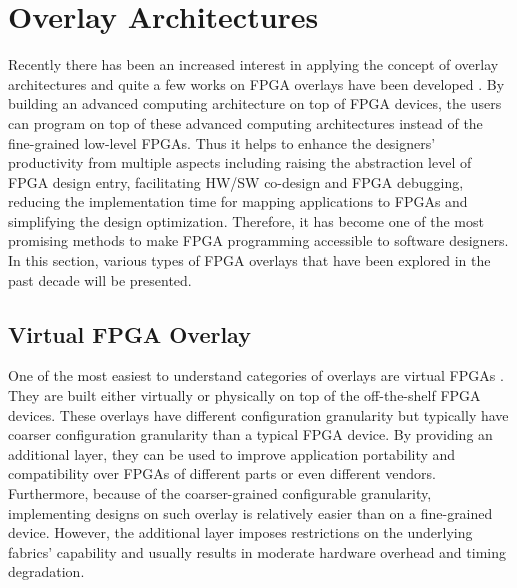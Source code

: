 \section{Overlay Architectures}
Recently there has been an increased interest in applying the concept of overlay architectures and quite a few works on FPGA overlays have been developed \cite{lysecky2005firm, brant2012ZUMA, grant2011malibu, coole2010intermediate, koch2013efficient, ferreira2011fpga, shukla2006quku, lin2012energy, capalijia2013pipelined, microblaze, nios, cheah2012iDEA, laforest2012OCTAVO, yiannacouras2007exploration, anjam2010vliw,hannig2014invasive, boppu2014compact, yiannacouras2009fine, guy2012VENICE, buciak2007lightweight, liu2004fpga}. By building an advanced computing architecture on top of FPGA devices, the users can program on top of these advanced computing architectures instead of the fine-grained low-level FPGAs. Thus it helps to enhance the designers' productivity from multiple aspects including raising the abstraction level of FPGA design entry, facilitating HW/SW co-design and FPGA debugging, reducing the implementation time for mapping applications to FPGAs and simplifying the design optimization. Therefore, it has become one of the most promising methods to make FPGA programming accessible to software designers. In this section, various types of FPGA overlays that have been explored in the past decade will be presented.

\subsection{Virtual FPGA Overlay}
One of the most easiest to understand categories of overlays are virtual FPGAs \cite{lysecky2005firm, brant2012ZUMA, grant2011malibu, coole2010intermediate, koch2013efficient}. They are built either virtually or physically on top of the off-the-shelf FPGA devices. These overlays have different configuration granularity but typically have coarser configuration granularity than a typical FPGA device. By providing an additional layer, they can be used to improve application portability and compatibility over FPGAs of different parts or even different vendors. Furthermore, because of the coarser-grained configurable granularity, implementing designs on such overlay is relatively easier than on a fine-grained device. However, the additional layer imposes restrictions on the underlying fabrics' capability and usually results in moderate hardware overhead and timing degradation.

